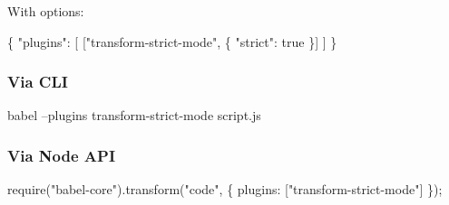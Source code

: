 With options\+:


\begin{DoxyCode}
\{
  "plugins": [
    ["transform-strict-mode", \{
      "strict": true
    \}]
  ]
\}
\end{DoxyCode}


\subsubsection*{Via C\+LI}


\begin{DoxyCode}
babel --plugins transform-strict-mode script.js
\end{DoxyCode}


\subsubsection*{Via Node A\+PI}


\begin{DoxyCode}
require("babel-core").transform("code", \{
  plugins: ["transform-strict-mode"]
\});
\end{DoxyCode}
 
